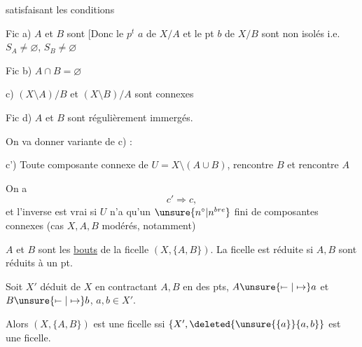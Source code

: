 satisfaisant les conditions

Fic a) $A$ et $B$ sont 
[Donc le $p^t$ $a$ de $X/A$ et le pt $b$ de $X/B$ sont non isolés
i.e. $S_A\ne\varnothing$, $S_B\ne\varnothing$

Fic b)  $A\cap B=\varnothing$

c) $(X\setminus A)/B$ et $(X\setminus B)/A$ sont connexes

Fic d) $A$ et $B$ sont régulièrement immergés.



On va donner   variante de c) :

c')  Toute composante connexe  de $U=X\setminus(A\cup B)$,
 rencontre $B$ et rencontre $A$

On a
\[
c'\Longrightarrow c,
\]
et l'inverse est vrai si $U$ n'a qu'un $\unsure{n^\circ|n^{bre}}$ fini de composantes connexes
(cas $X,A,B$ modérés, notamment)




$A$ et $B$ sont les \uline{bouts}  de la ficelle $(X,\{A,B\})$.
La ficelle est réduite si $A,B$ sont réduits à un pt.

Soit $X'$ déduit de $X$ en contractant $A,B$ en des pts,
$A\unsure{\mapstochar\relbar|\mapsto}a$ et $B\unsure{\mapstochar\relbar|\mapsto}b$,
$a,b\in X'$.


Alors $(X,\{A,B\})$ est une ficelle ssi
$\{X',\deleted{\unsure{\{a}}\{a,b\}\}$ est une ficelle.


